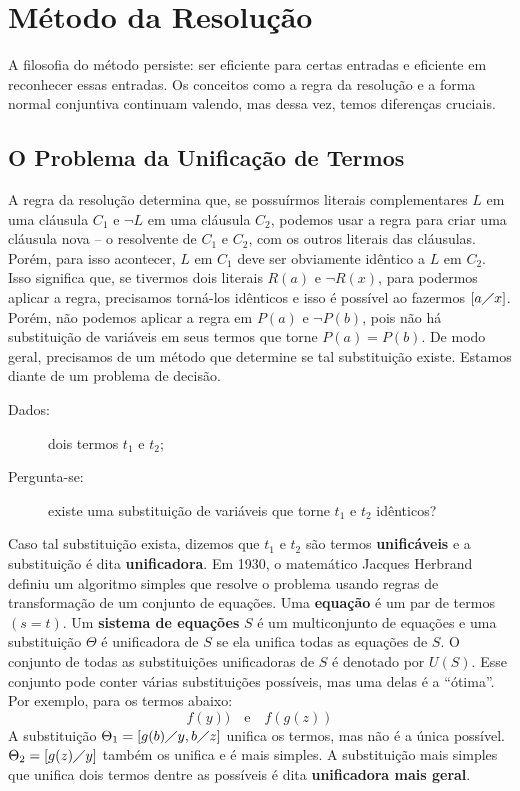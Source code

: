 \section{Método da Resolução}

A filosofia do método persiste: ser eficiente para certas entradas e eficiente em reconhecer essas entradas. Os conceitos como a regra da resolução e a forma normal conjuntiva continuam valendo, mas dessa vez, temos diferenças cruciais.
\subsection{O Problema da Unificação de Termos}
A regra da resolução determina que, se possuírmos literais complementares $L$ em uma cláusula $C_1$ e $\neg L$ em uma cláusula $C_2$, podemos usar a regra para criar uma cláusula nova -- o resolvente de $C_1$ e $C_2$, com os outros literais das cláusulas. Porém, para isso acontecer, $L$ em $C_1$ deve ser obviamente idêntico a $L$ em $C_2$. Isso significa que, se tivermos dois literais $R(a)$ e $\neg R(x)$, para podermos aplicar a regra, precisamos torná-los idênticos e isso é possível ao fazermos $[a\diagup x]$. Porém, não podemos aplicar a regra em $P(a)$ e $\neg P(b)$, pois não há substituição de variáveis em seus termos que torne $P(a) = P(b)$. De modo geral, precisamos de um método que determine se tal substituição existe. Estamos diante de um problema de decisão.

\begin{description}
    \item[Dados:] dois termos $t_1$ e $t_2$;
    \item[Pergunta-se:] existe uma substituição de variáveis que torne $t_1$ e $t_2$ idênticos? 
\end{description}

Caso tal substituição exista, dizemos que $t_1$ e $t_2$ são termos \textbf{unificáveis} e a substituição é dita \textbf{unificadora}. Em 1930, o matemático Jacques Herbrand definiu um algoritmo simples que resolve o problema usando regras de transformação de um conjunto de equações. Uma \textbf{equação} é um par de termos $(s = t)$. Um \textbf{sistema de equações} $S$ é um multiconjunto de equações e uma substituição $\Theta$ é unificadora de $S$ se ela unifica todas as equações de $S$. O conjunto de todas as substituições unificadoras de $S$ é denotado por $U(S)$. Esse conjunto pode conter várias substituições possíveis, mas uma delas é a ``ótima''. Por exemplo, para os termos abaixo:
\[f(y))\quad\text{e}\quad f(g(z))\]
A substituição $\Theta_1 = [g(b)\diagup y, b\diagup z]$ unifica os termos, mas não é a única possível. $\Theta_2 = [g(z)\diagup y]$ também os unifica e é mais simples. A substituição mais simples que unifica dois termos dentre as possíveis é dita \textbf{unificadora mais geral}.

